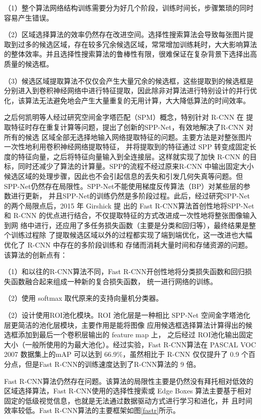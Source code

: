 （1）整个算法网络结构训练需要分为好几个阶段，训练时间长，步骤繁琐的同时容易产生错误。

（2）区域选择算法的效率仍然存在改进空间。选择性搜索算法会导致每张图片提取到过多的候选区域，存在较多冗余候选区域，常常增加训练耗时，大大影响算法的整体效率。并且选择性搜索算法的鲁棒性有限，很难保证在复杂背景下选择出高质量的候选框。

（3）候选区域提取算法不仅仅会产生大量冗余的候选框，这些提取到的候选框是分别进入到卷积神经网络中进行特征提取，因此除非对算法进行特别设计的并行优化，该算法无法避免地会产生大量重复的无用计算，大大降低算法的时间效率。

之后何凯明等人经过研究空间金字塔匹配（SPM）概念，特别针对 R-CNN 在
提取特征时存在重复计算等问题，提出了创新的SPP-Net\cite{purkait2017spp}，有效地解决了R-CNN 对所有的候选
区域全部无选择地输入网络提取特征的问题。主要方法是对整张图片一次性地利用卷积神经网络提取特征，
并将提取到的特征通过 SPP 转变成固定长度的特征向量，之后将特征向量输入到全连接层。这样就实现了加快
R-CNN 的目标，同时还减少了算法的计算量。SPP的流程不经过原来R-CNN 中输出固定大小候选区域的处理步骤，因此也不会引起信息的丢失和引发几何失真等问题。但
SPP-Net仍然存在局限性。SPP-Net不能使用梯度反传算法（BP）对某些层的参数进行更新，
并且SPP-Net的训练仍然是多阶段过程。此后，经过研究SPP-Net 的两个局限点后，2015 年 Girshick 提
出的 Fast R-CNN\cite{girshick2015fast}算法首创性地将SPP-Net 和 R-CNN 的优点进行结合，不仅提取特征的方式改进成一次性地将整张图像输入到网
络中进行，还应用了多任务损失函数（主要是分类和回归等），最终结果是整个训练过程除
了提取候选区域以外的过程都实现了端到端优化，这一改进也大幅优化了 R-CNN 中存在的多阶段训练和
存储而消耗大量时间和存储资源的问题。该算法的创新点有：

（1）和以往的R-CNN算法不同，Fast R-CNN开创性地将分类损失函数和回归损失函数融合起来组成一种新的复合损失函数，
统一进行网络的训练。

（2）使用 softmax 取代原来的支持向量机分类器。

（2）设计使用ROI池化模块。ROI
池化层是一种相比 SPP-Net 空间金字塔池化层更简洁的池化层模块，主要作用是能将图像
应用候选框选择算法计算得出的候选框添加到最后一个卷积层输出的 feature map 上，
之后经过 ROI池化输出固定大小（一般所使用的为最大池化）。经过实验，Fast R-CNN算法在
PASCAL VOC 2007 数据集上的mAP 可以达到 66.9$\%$，虽然相比于 R-CNN 仅仅提升了 0.9
个百分点，但是Fast R-CNN的训练速度达到了R-CNN算法的 9 倍。

Fast R-CNN算法仍然存在问题。该算法的局限性主要是仍然没有拜托相对低效的区域选择算法，Fast R-CNN使用的选择性搜索或 Edge Boxes 算法主要基于相对固定的低级视觉信息，也就是无法通过数据驱动方式进行学习和进化，并
且时间效率较低。Fast R-CNN算法的主要框架如图\ref{fastr}所示。

